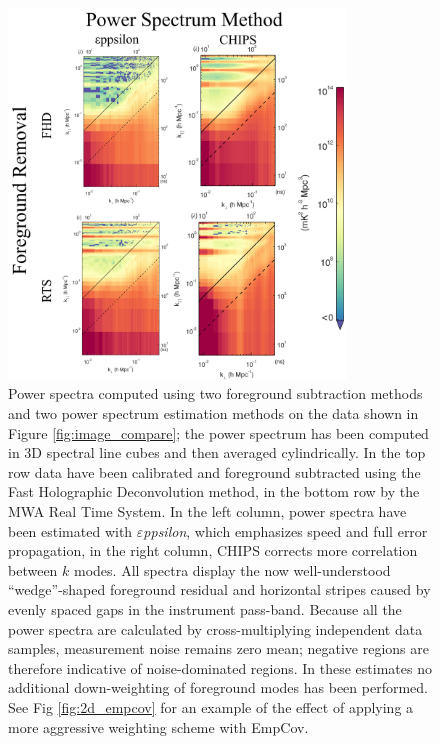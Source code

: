 \documentclass[twolcolumn,iop]{emulateapj}
\def\eppsilon{{\it $\varepsilon$ppsilon}}
\def\empirical{EmpCov}
\begin{document}
\begin{figure}[htbp]
\begin{center}
\includegraphics[width=0.8\textwidth]{figures/MWA_PS_compare/MWA_PS_compare.png}
\caption{Power spectra computed using two foreground subtraction methods and two power spectrum estimation methods on the data shown in Figure \ref{fig:image_compare}; the power spectrum has been computed in 3D spectral line cubes and then averaged cylindrically.  In the top row data have been calibrated and foreground subtracted using the Fast Holographic Deconvolution method, in the bottom row by the MWA Real Time System.  In the left column, power spectra have been estimated with \eppsilon{}, which emphasizes speed and full error propagation, in the right column, CHIPS corrects more correlation between $k$ modes.  All spectra display the now well-understood ``wedge''-shaped foreground residual and horizontal stripes caused by evenly spaced gaps in the instrument pass-band. Because all the power spectra are calculated by cross-multiplying independent data samples, measurement noise remains zero mean; negative regions are therefore indicative of noise-dominated regions. 
In these estimates no additional down-weighting of foreground modes has been performed. See Fig   \ref{fig:2d_empcov} for an example of the effect of applying a more aggressive weighting scheme with \empirical{}.
\label{fig:pspec_compare}}
\end{center}
\end{figure}
\end{document}
